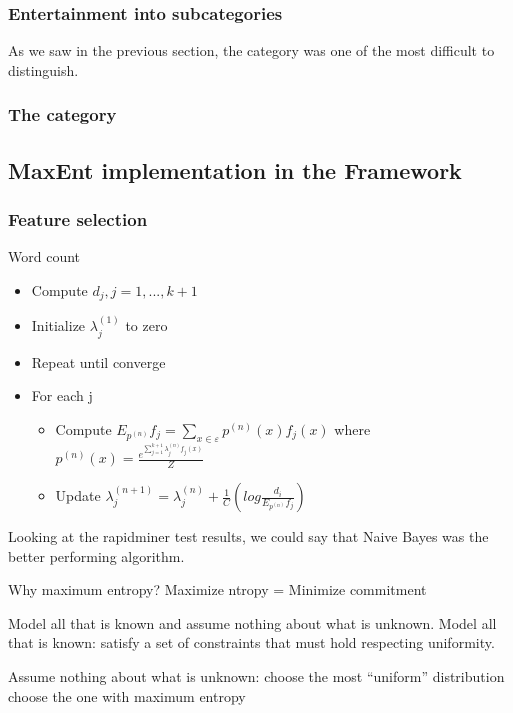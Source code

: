 \subsubsection{Entertainment into subcategories}
As we saw in the previous section, the category  was one of the most difficult to distinguish. 

\subsubsection{The  category}

\subsection{MaxEnt implementation in the Framework}


\subsubsection{Feature selection}
Word count

\begin{itemize}
\item Compute $d_j, j=1,...,k+1$
\item Initialize $\lambda_j^{(1)}$ to zero
\item Repeat until converge
\item For each j 
  \begin{itemize}
  \item Compute $E_{p^{(n)}} f_j = \sum\limits_{x \in \varepsilon} p^{(n)} (x)f_j(x)$
    where $p^{(n)}(x) = \frac{e^{\sum\limits_{j=1}^{k+1}\lambda_j^{(n)}f_j(x)}}{Z}$ 
  \item Update $\lambda_j^{(n+1)} = \lambda_j^{(n)} + \frac{1}{C}(log\frac{d_i}{E_{{p^{(n)}}}f_j})$
  \end{itemize}
\end{itemize}

  
Looking at the rapidminer test results, we could say that Naive Bayes was the better performing algorithm. 

Why maximum entropy?
Maximize ntropy = Minimize commitment

Model all that is known and assume nothing about what is unknown. 
Model all that is known: satisfy a set of constraints that must hold respecting uniformity.

Assume nothing about what is unknown: 
   choose the most “uniform” distribution 
   choose the one with maximum entropy

